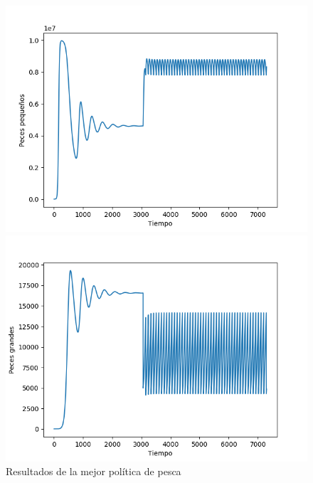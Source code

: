\documentclass[11pt,a4paper]{report}
\begin{document}
\begin{figure}[H]
	\begin{minipage}{0.5\textwidth}
	  \centering
	  \includegraphics[scale=0.45]{img/pequenios-4000-25-pescapol.png}
	\end{minipage}
	\begin{minipage}{0.5\textwidth}
	  \centering
	  \includegraphics[scale=0.45]{img/grandes-4000-25-pescapol.png}
	\end{minipage}
	\caption{Resultados de la mejor política de pesca}
\end{figure}
\end{document}

